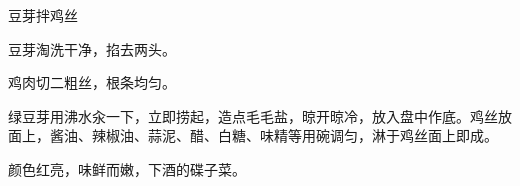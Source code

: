 \begin{recipe}[银芽拌鸡丝]{豆芽拌鸡丝}

\ingredients


\preparation

\step 豆芽淘洗干净，掐去两头。

\step 鸡肉切二粗丝，根条均匀。

\step 绿豆芽用沸水汆一下，立即捞起，造点毛毛盐，晾开晾冷，放入盘中作底。鸡丝放
面上，酱油、辣椒油、蒜泥、醋、白糖、味精等用碗调匀，淋于鸡丝面上即成。

\features

颜色红亮，味鲜而嫩，下酒的碟子菜。

\end{recipe}

